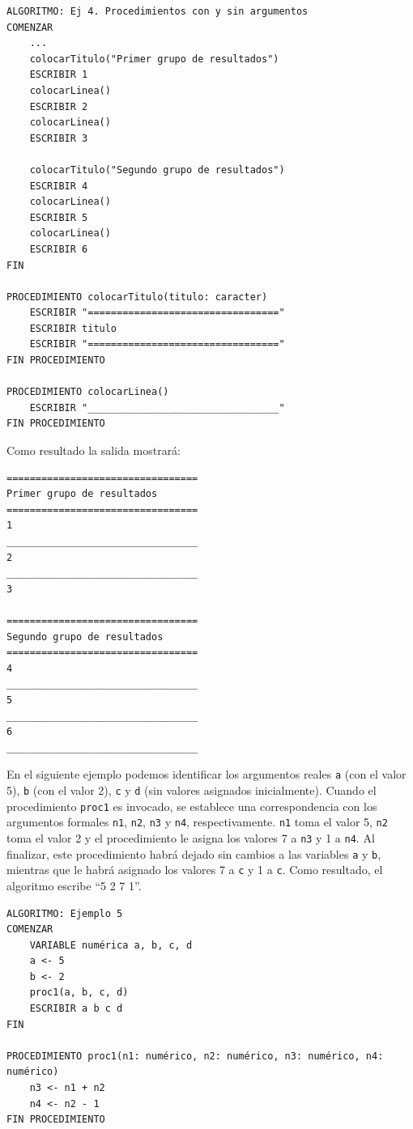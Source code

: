 \documentclass[]{book}
\begin{document}
\begin{verbatim}
ALGORITMO: Ej 4. Procedimientos con y sin argumentos
COMENZAR
    ...
    colocarTitulo("Primer grupo de resultados")
    ESCRIBIR 1
    colocarLinea()
    ESCRIBIR 2
    colocarLinea()
    ESCRIBIR 3

    colocarTitulo("Segundo grupo de resultados")
    ESCRIBIR 4
    colocarLinea()
    ESCRIBIR 5
    colocarLinea()
    ESCRIBIR 6
FIN

PROCEDIMIENTO colocarTitulo(titulo: caracter)
    ESCRIBIR "================================="
    ESCRIBIR titulo
    ESCRIBIR "================================="
FIN PROCEDIMIENTO

PROCEDIMIENTO colocarLinea()
    ESCRIBIR "_________________________________"
FIN PROCEDIMIENTO
\end{verbatim}

Como resultado la salida mostrará:

\begin{verbatim}
=================================
Primer grupo de resultados
=================================
1
_________________________________
2
_________________________________
3

=================================
Segundo grupo de resultados
=================================
4
_________________________________
5
_________________________________
6
_________________________________
\end{verbatim}

En el siguiente ejemplo podemos identificar los argumentos reales
\texttt{a} (con el valor 5), \texttt{b} (con el valor 2), \texttt{c} y
\texttt{d} (sin valores asignados inicialmente). Cuando el procedimiento
\texttt{proc1} es invocado, se establece una correspondencia con los
argumentos formales \texttt{n1}, \texttt{n2}, \texttt{n3} y \texttt{n4},
respectivamente. \texttt{n1} toma el valor 5, \texttt{n2} toma el valor
2 y el procedimiento le asigna los valores 7 a \texttt{n3} y 1 a
\texttt{n4}. Al finalizar, este procedimiento habrá dejado sin cambios a
las variables \texttt{a} y \texttt{b}, mientras que le habrá asignado
los valores 7 a \texttt{c} y 1 a \texttt{c}. Como resultado, el
algoritmo escribe ``5 2 7 1''.

\begin{verbatim}
ALGORITMO: Ejemplo 5
COMENZAR
    VARIABLE numérica a, b, c, d
    a <- 5
    b <- 2
    proc1(a, b, c, d)
    ESCRIBIR a b c d
FIN

PROCEDIMIENTO proc1(n1: numérico, n2: numérico, n3: numérico, n4: numérico)
    n3 <- n1 + n2
    n4 <- n2 - 1
FIN PROCEDIMIENTO
\end{verbatim}
\end{document}
